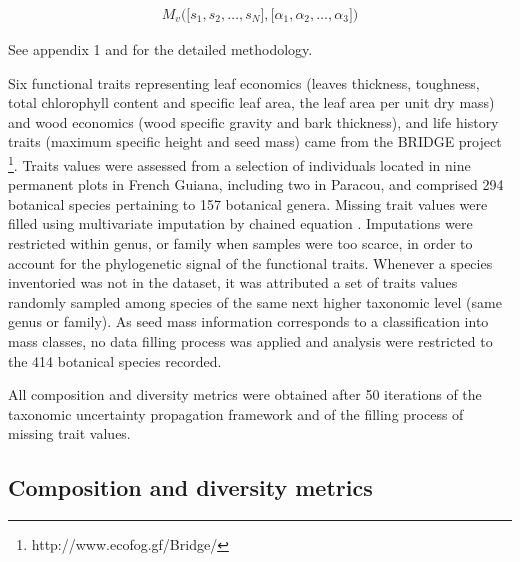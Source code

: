 \documentclass[fleqn,10pt]{ArtEcoFoG} %
\theoremstyle{definition}
\theoremstyle{definition}
\theoremstyle{definition}
\theoremstyle{remark}
\begin{document}
\begin{align}
M_v\Big(\big[s_1, s_2, …, s_N\big],\big[\alpha_1, \alpha_2,…, \alpha_3\big]\Big) \nonumber
\end{align}

See appendix 1 and \citet{Aubry-Kientz2013} for the detailed
methodology.

Six functional traits representing leaf economics (leaves thickness,
toughness, total chlorophyll content and specific leaf area, the leaf
area per unit dry mass) and wood economics (wood specific gravity and
bark thickness), and life history traits (maximum specific height and
seed mass) came from the BRIDGE project \footnote{http://www.ecofog.gf/Bridge/}.
Traits values were assessed from a selection of individuals located in
nine permanent plots in French Guiana, including two in Paracou, and
comprised 294 botanical species pertaining to 157 botanical genera.
Missing trait values were filled using multivariate imputation by
chained equation \citep{Mice2011}. Imputations were restricted within
genus, or family when samples were too scarce, in order to account for
the phylogenetic signal of the functional traits. Whenever a species
inventoried was not in the dataset, it was attributed a set of traits
values randomly sampled among species of the same next higher taxonomic
level (same genus or family). As seed mass information corresponds to a
classification into mass classes, no data filling process was applied
and analysis were restricted to the 414 botanical species recorded.

All composition and diversity metrics were obtained after 50 iterations
of the taxonomic uncertainty propagation framework and of the filling
process of missing trait values.

\subsection{Composition and diversity
metrics}\label{composition-and-diversity-metrics}
\end{document}
